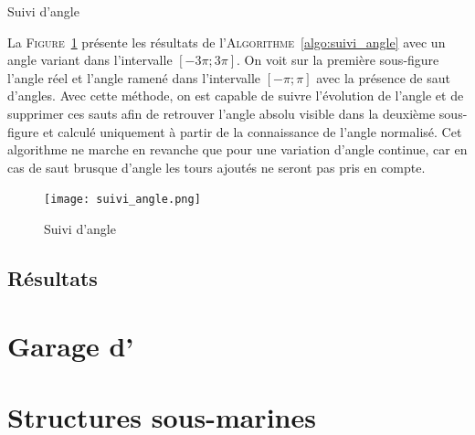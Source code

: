 				\begin{algorithm}[!htb]
			
					\caption{Suivi d'angle} 
					\label{algo:suivi_angle}
				\end{algorithm}
			
				La \textsc{Figure}~\ref{fig:suivi_angle} présente les résultats de l'\textsc{Algorithme}~\ref{algo:suivi_angle} avec un angle variant dans l'intervalle $[-3\pi; 3\pi]$. On voit sur la première sous-figure l'angle réel et l'angle ramené dans l'intervalle $[-\pi; \pi]$ avec la présence de saut d'angles. Avec cette méthode, on est capable de suivre l'évolution de l'angle et de supprimer ces sauts afin de retrouver l'angle absolu visible dans la deuxième sous-figure et calculé uniquement à partir de la connaissance de l'angle normalisé. Cet algorithme ne marche en revanche que pour une variation d'angle continue, car en cas de saut brusque d'angle les tours ajoutés ne seront pas pris en compte.
			
				\begin{figure}[!htb]
					\centering
					\texttt{[image: suivi\_angle.png]}
					\caption{Suivi d'angle}
					\label{fig:suivi_angle}
				\end{figure}		
		
		\subsection{Résultats}

		\section{Garage d'\argos{}}

		\section{Structures sous-marines}
		